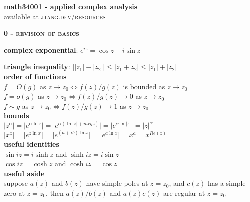 \documentclass[a4paper]{article}
\newcommand\abs[1]{\ensuremath{\lvert#1\rvert}}
\begin{document}
	
\begin{center}
	\huge{\textbf{math34001 - applied complex analysis}}\\
	\small{available at \textsc{jtang.dev/resources}}\\
\end{center}

\begin{multicols}{2}

\begin{framed}
	\begin{center}
		\textbf{\textsc{0 - revision of basics}}
	\end{center}
	
	\noindent
	\textbf{complex exponential}: $e^{iz} = \cos z + i\sin z$
	
	\noindent
	\textbf{triangle inequality}: $\abs{\abs{z_1} - \abs{z_2}} \leq \abs{z_1 + z_2} \leq \abs{z_1} + \abs{z_2}$\\
	
	\noindent
	\textbf{order of functions}\\
	$f = O(g)$ as $z \rightarrow z_0 \iff f(z)/g(z)$ is bounded as $z \rightarrow z_0$\\
	$f = o(g)$ as $z \rightarrow z_0 \iff f(z)/g(z) \rightarrow 0$ as $z \rightarrow z_0$\\
	$f \sim g$ as $z \rightarrow z_0 \iff f(z)/g(z) \rightarrow 1$ as $z \rightarrow z_0$\\
	
	\noindent
	\textbf{bounds}\\
	$\abs{z^\alpha} = \abs{e^{\alpha \ln z}} = \abs{e^{\alpha(\ln \abs{z} + i arg z)}} = \abs{e^{\alpha \ln\abs{z}}} = \abs{z}^\alpha$\\
	$\abs{x^{z}} = \abs{e^{z \ln x}} = \abs{e^{(a + ib)\ln x}} = \abs{e^{a \ln x}} = x^a = x^{Re(z)}$\\
	
	\noindent
	\textbf{useful identities}\\
	$\sin iz = i\sinh z$ and $\sinh iz = i \sin z$\\
	$\cos iz = \cosh z$ and $\cosh iz = \cos z$\\
	
	\noindent
	\textbf{useful aside}\\
	suppose $a(z)$ and $b(z)$ have simple poles at $z = z_0$, and $c(z)$ has a simple zero at $z = z_0$, then $a(z)/b(z)$ and $a(z)c(z)$ are regular at $z = z_0$
\end{framed}


\end{multicols}
\end{document}
